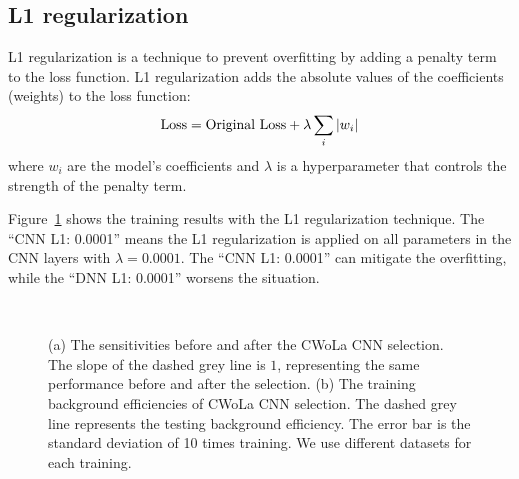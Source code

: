 \documentclass[12pt]{article}
\begin{document}
	\subsection{L1 regularization}%
	\label{sub:l1_regularization}
		L1 regularization is a technique to prevent overfitting by adding a penalty term to the loss function. L1 regularization adds the absolute values of the coefficients (weights) to the loss function:
		\begin{equation}
			\text{Loss} = \text{Original Loss} + \lambda \sum_{i} \abs{w_i}
		\end{equation}
		where $w_i$ are the model's coefficients and $\lambda$ is a hyperparameter that controls the strength of the penalty term.

		Figure~\ref{fig:sensitivity_improvement_background_pass_rate_l1} shows the training results with the L1 regularization technique. The ``CNN L1: 0.0001'' means the L1 regularization is applied on all parameters in the CNN layers with $\lambda = 0.0001$. The ``CNN L1: 0.0001'' can mitigate the overfitting, while the ``DNN L1: 0.0001'' worsens the situation.
        \begin{figure}[htpb]
            \centering
             \\
            \caption{(a) The sensitivities before and after the CWoLa CNN selection. The slope of the dashed grey line is $1$, representing the same performance before and after the selection. (b) The training background efficiencies of CWoLa CNN selection. The dashed grey line represents the testing background efficiency. The error bar is the standard deviation of 10 times training. We use different datasets for each training.}
            \label{fig:sensitivity_improvement_background_pass_rate_l1}
        \end{figure}
\end{document}
